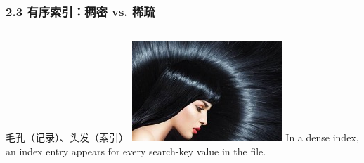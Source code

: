 \documentclass[aspectratio=169, 14pt]{beamer}
\begin{document}
\begin{frame}
	\frametitle{2.3 有序索引：稠密 vs. 稀疏}
	\begin{columns}
		毛孔（记录）、头发（索引）
		\includegraphics[width=.99\textwidth]{week11/hair}
		In a dense index, an index entry appears for every search-key value in the file.
	\end{columns}

\end{frame}
\end{document}
